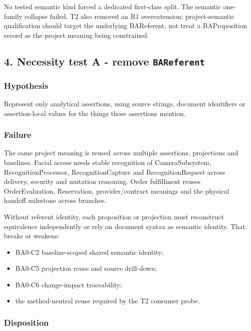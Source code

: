 \documentclass[
  10pt,
  a4paper,
]{article}
\providecommand{\tightlist}{%
  \setlength{\itemsep}{0pt}\setlength{\parskip}{0pt}}
\begin{document}
No tested semantic kind forced a dedicated first-class split. The
semantic one-family collapse failed. T2 also removed an R1
overextension: project-semantic qualification should target the
underlying BAReferent, not treat a BAProposition record as the project
meaning being constrained.

\subsection{\texorpdfstring{4. Necessity test A - remove
\texttt{BAReferent}}{4. Necessity test A - remove BAReferent}}\label{necessity-test-a---remove-bareferent}

\subsubsection{Hypothesis}\label{hypothesis}

Represent only analytical assertions, using source strings, document
identifiers or assertion-local values for the things those assertions
mention.

\subsubsection{Failure}\label{failure}

The same project meaning is reused across multiple assertions,
projections and baselines. Facial access needs stable recognition of
CameraSubsystem, RecognitionProcessor, RecognitionCapture and
RecognitionRequest across delivery, security and mutation reasoning.
Order fulfillment reuses OrderEvaluation, Reservation, provider/contract
meanings and the physical handoff milestone across branches.

Without referent identity, each proposition or projection must
reconstruct equivalence independently or rely on document syntax as
semantic identity. That breaks or weakens:

\begin{itemize}
\tightlist
\item
  BA0-C2 baseline-scoped shared semantic identity;
\item
  BA0-C5 projection reuse and source drill-down;
\item
  BA0-C6 change-impact traceability;
\item
  the method-neutral reuse required by the T2 consumer probe.
\end{itemize}

\subsubsection{Disposition}\label{disposition}
\end{document}
